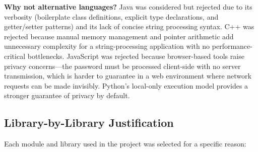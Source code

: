 \textbf{Why not alternative languages?} Java was considered but rejected due to its verbosity (boilerplate class definitions, explicit type declarations, and getter/setter patterns) and its lack of concise string processing syntax. C++ was rejected because manual memory management and pointer arithmetic add unnecessary complexity for a string-processing application with no performance-critical bottlenecks. JavaScript was rejected because browser-based tools raise privacy concerns---the password must be processed client-side with no server transmission, which is harder to guarantee in a web environment where network requests can be made invisibly. Python's local-only execution model provides a stronger guarantee of privacy by default.

\subsection{Library-by-Library Justification}

Each module and library used in the project was selected for a specific reason:

